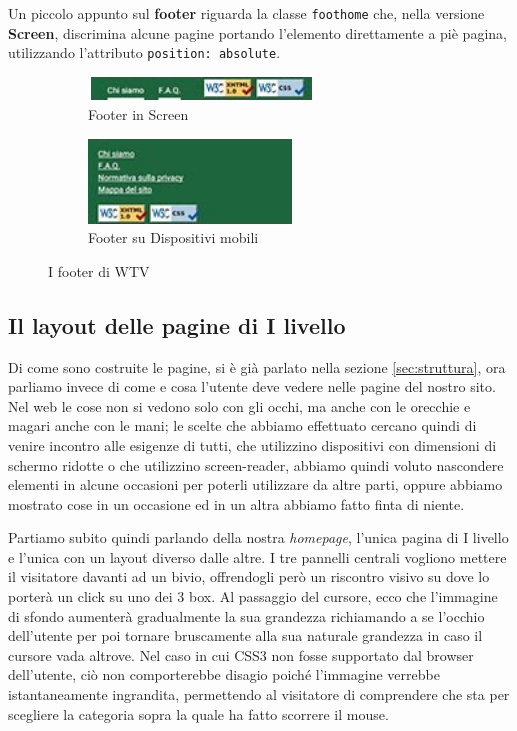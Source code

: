 Un piccolo appunto sul \textbf{footer} riguarda la classe \texttt{foothome}
che, nella versione \textbf{Screen}, discrimina alcune pagine portando
l'elemento direttamente a piè pagina, utilizzando l'attributo
\texttt{position: absolute}.
\begin{figure}[h!]
        \centering
        \begin{subfigure}[b]{0.3\textwidth}
                \includegraphics[height=0.62cm,width=6cm]{images/pres_footer.jpg}
                \caption{Footer in Screen}
                \label{fig:Footer-screen}
        \end{subfigure}
        \hspace{4cm}
        \begin{subfigure}[b]{0.3\textwidth}
                \includegraphics[height=2.25cm,width=5.4cm]{images/pres_footer_m.jpg}
                \caption{Footer su Dispositivi mobili}
                \label{fig:Footer-mobile}
        \end{subfigure}
        \caption{I footer di WTV}\label{fig:Display-Footer}
\end{figure}

\subsection{Il layout delle pagine di I livello}\label{sec:Pres-Iliv}
Di come sono costruite le pagine, si è già parlato nella sezione
\ref{sec:struttura}, ora parliamo invece di come e cosa l'utente deve vedere
nelle pagine del nostro sito.
Nel web le cose non si vedono solo con gli occhi, ma anche con le orecchie e
magari anche con le mani; le scelte che abbiamo effettuato cercano quindi di
venire incontro alle esigenze di tutti, che utilizzino dispositivi con
dimensioni di schermo ridotte o che utilizzino screen-reader, abbiamo quindi
voluto nascondere elementi in alcune occasioni per poterli utilizzare da altre
parti, oppure abbiamo mostrato cose in un occasione ed in un altra abbiamo
fatto finta di niente.

Partiamo subito quindi parlando della nostra \textit{homepage}, l'unica pagina
di I livello e l'unica con un layout diverso dalle altre. I tre pannelli
centrali vogliono mettere il visitatore davanti ad un bivio, offrendogli però
un riscontro visivo su dove lo porterà un click su uno dei 3 box. Al
passaggio del cursore, ecco che l'immagine di sfondo aumenterà gradualmente la
sua grandezza richiamando a se l'occhio dell'utente per poi tornare
bruscamente alla sua naturale grandezza in caso il cursore vada altrove. Nel
caso in cui CSS3 non fosse supportato dal browser dell'utente, ciò non
comporterebbe disagio poiché l'immagine verrebbe istantaneamente ingrandita,
permettendo al visitatore di comprendere che sta per scegliere la categoria
sopra la quale ha fatto scorrere il mouse.

